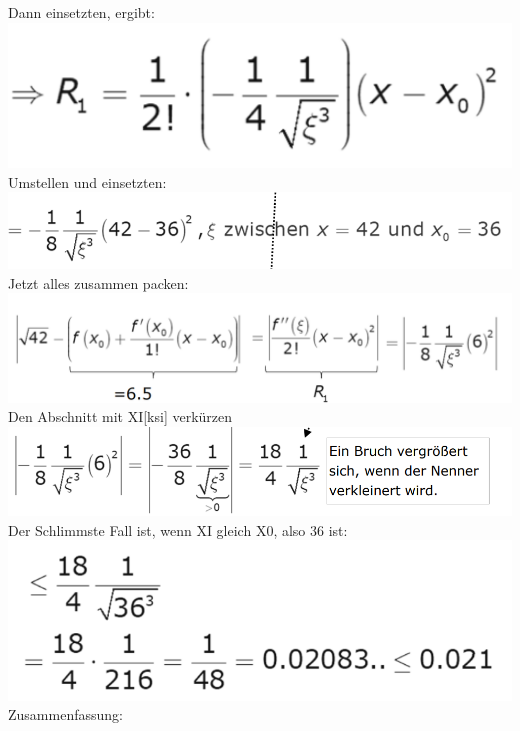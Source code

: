 \documentclass[12pt,a4paper]{article}
\begin{document}
\newpage
Dann einsetzten, ergibt:\\
\includegraphics[width=1\textwidth]{Bilder/V1/15.png}\\
Umstellen und einsetzten:\\
\includegraphics[width=1\textwidth]{Bilder/V1/16.png}\\
Jetzt alles zusammen packen:\\
\includegraphics[width=1\textwidth]{Bilder/V1/17.png}\\
Den Abschnitt mit XI[ksi] verkürzen\\
\includegraphics[width=1\textwidth]{Bilder/V1/18.png}\\
Der Schlimmste Fall ist, wenn XI gleich X0, also 36 ist:\\
\includegraphics[width=1\textwidth]{Bilder/V1/19.png}\\
Zusammenfassung:\\
\end{document}
